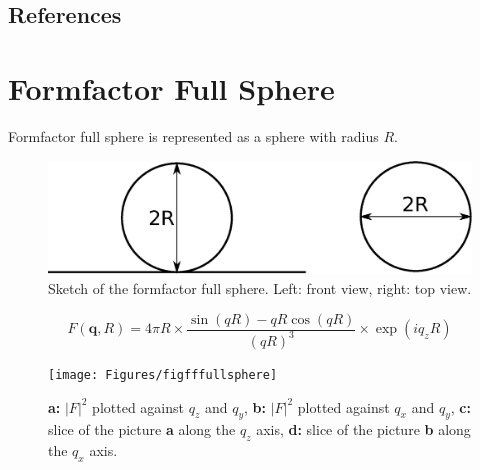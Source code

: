 \subsection{References}

\newpage{\cleardoublepage}


\section{Formfactor Full Sphere}
Formfactor full sphere is represented as a sphere with radius $R$. 
\begin{figure}[ht]
\begin{center}
\includegraphics[width=0.6\columnwidth]{Figures/fullsphere}
\caption{Sketch of the formfactor full sphere. Left: front view, right: top view.}
\end{center}
\label{fullsphere}
\end{figure}

\begin{equation}
F(\mathbf q, R) = 4\pi R\times\frac{\sin(qR)-qR\cos(qR)}{(qR)^3}\times\exp\left(iq_zR\right)
\end{equation}

\begin{figure}[h]
\begin{center}
\texttt{[image: Figures/figfffullsphere]}
\end{center}
\caption{{\bf a:} $|F|^2$ plotted against $q_z$ and $q_y$, {\bf b:} $|F|^2$ plotted against $q_x$ and $q_y$, {\bf c:} slice of the picture {\bf a} along the $q_z$ axis, {\bf d:} slice of the picture {\bf b} along the $q_x$ axis.}
\end{figure}

\par

